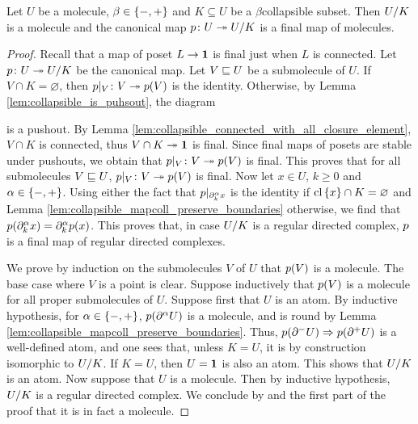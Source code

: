 \begin{prop} \label{prop:collapsible_collapse_to_molecules}
    Let \( U \) be a molecule, \( \beta \in \set{-, +} \) and \( K \subseteq U \) be a \( \beta \)\nbd collapsible subset.
    Then \( \coll{K}{U} \) is a molecule and the canonical map \( \mapcoll \colon U \surj \coll{K}{U} \) is a final map of molecules.
\end{prop}
\begin{proof}
    Recall that a map of poset \( L \to \pt \) is final just when \( L \) is connected. 
    Let \( \mapcoll \colon U \surj \coll{K}{U} \) be the canonical map.
    Let \( V \submol U \) be a submolecule of \( U \). 
    If \( V \cap K = \varnothing \), then \( \restr{\mapcoll}{V} \colon V \surj \mapcoll(V) \) is the identity.
    Otherwise, by Lemma \ref{lem:collapsible_is_puhsout}, the diagram
    \begin{center}
    \end{center}
    is a pushout.
    By Lemma \ref{lem:collapsible_connected_with_all_closure_element}, \( V \cap K \) is connected, thus \( V \cap K \surj \pt \) is final.
    Since final maps of posets are stable under pushouts, we obtain that \( \restr{\mapcoll}{V} \colon V \surj \mapcoll(V) \) is final.
    This proves that for all submolecules \( V \submol U \), \( \restr{\mapcoll}{V} \colon V \surj \mapcoll(V) \) is final.
    Now let \( x \in U \), \( k \geq 0 \) and \( \a \in \set{-, +} \).
    Using either the fact that \( \restr{p}{\bd{k}{\a} x} \) is the identity if \( \clset{x} \cap K = \varnothing \) and Lemma \ref{lem:collapsible_mapcoll_preserve_boundaries} otherwise, we find that \( \mapcoll(\bd{k}{\a} x) = \bd{k}{\a} \mapcoll(x) \).
    This proves that, in case \( \coll{K}{U} \) is a regular directed complex, \( \mapcoll \) is a final map of regular directed complexes.

    We prove by induction on the submolecules \( V \) of \( U \) that \( \mapcoll(V) \) is a molecule.
    The base case where \( V \) is a point is clear.
    Suppose inductively that \( \mapcoll(V) \) is a molecule for all proper submolecules of \( U \).
    Suppose first that \( U \) is an atom.
    By inductive hypothesis, for \( \a \in \set{-, +} \), \( p(\bd{}{\a} U) \) is a molecule, and is round by Lemma \ref{lem:collapsible_mapcoll_preserve_boundaries}.
    Thus, \( p(\bd{}{-} U) \celto p(\bd{}{+} U) \) is a well-defined atom, and one sees that, unless \( K = U \), it is by construction isomorphic to \( \coll{K}{U} \).
    If \( K = U \), then \( U = \pt \) is also an atom. 
    This shows that \( \coll{K}{U} \) is an atom.
    Now suppose that \( U \) is a molecule.
    Then by inductive hypothesis, \( \coll{K}{U} \) is a regular directed complex.
    We conclude by \cite[Proposition 6.2.33]{hadzihasanovic2024combinatorics} and the first part of the proof that it is in fact a molecule.
\end{proof}

